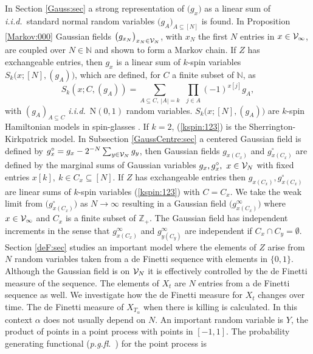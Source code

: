 \documentclass[preprint,11pt]{elsarticle}
\theoremstyle{remark}
\def\pgfl{\emph{p.g.fl.~}}
\def\iid{\emph{i.i.d.}~}
\begin{document}
{In Section \ref{Gauss:sec} a strong representation of $\big (g_x\big )$ 
as a linear sum of \iid  standard normal random variables $\big (g_A\big )_{A\subseteq [N]}$ is found.
In Proposition \ref{Markov:000} Gaussian fields $\big (g_{x_N}\big )_{x_N \in {\cal V}_N}$, 
with $x_N$ the first $N$ entries in $x\in {\cal V}_\infty$, are coupled over $N\in \mathbb{N}$ and shown to form a Markov chain.
If $Z$ has exchangeable entries, then $g_x$ is a linear sum 
 of $k$-spin variables $S_k\big (x;[N],(g_A)\big )$, which  are defined, for $C$ a finite subset of $\mathbb{N}$, as
\begin{equation}
S_k(x;C,(g_A)) =\sum_{A \subseteq C,\ |A|=k}\ \ \prod_{j\in A}(-1)^{{x}[j]}g_A,
 \label{kspin:123}
\end{equation}
with $(g_A)_{A\subseteq C}$ \iid N$(0,1)$ random variables.
$S_k\big (x;[N],(g_A)\big )$ are $k$-spin Hamiltonian models in spin-glasses \citep{T2014}. If $k=2$, (\ref{kspin:123}) is the Sherrington-Kirkpatrick model.
In Subsection \ref{GaussCentre:sec} a centered Gaussian field is defined by
$g^\circ_x = g_x - 2^{-N}\sum_{y\in {\cal V}_N}g_y$,
then Gaussian fields $g_{x(C_x)}$ and  $g^\circ_{x(C_x)}$ are defined by the marginal sums of Gaussian variables $g_x, g^\circ_x,\
 x \in {\cal V}_N$ with fixed entries $x[k],\ k \in C_x \subseteq [N]$.
If
$Z$ has exchangeable entries then $g_{x(C_x)},g^\circ_{x(C_x)}$ are linear sums of $k$-spin variables (\ref{kspin:123}) with $C=C_x$.
% 
We take the weak limit from  $\big (g^{\circ}_{x(C_x)}\big )$
as $N\to \infty$ resulting in a Gaussian field 
%
$\big (g^{\infty}_{x(C_x)}\big )$
 where $x \in {\cal V}_\infty$ and $C_x$ is a finite subset of $\mathbb{Z}_+$.
The Gaussian field has independent increments in the sense that $g^\infty_{x(C_x)}$ and $g^\infty_{y(C_y)}$ are independent if $C_x\cap C_y = \emptyset$.
Section \ref{deF:sec} studies an important model where the elements of $Z$ arise from $N$ random variables taken from a de Finetti sequence with elements in $\{0,1\}$. 
Although the Gaussian field is on ${\cal V}_N$ it is effectively controlled by the de Finetti measure of the sequence. The elements of $X_t$ are $N$ entries from a de Finetti sequence as well. We investigate how the de Finetti measure for $X_t$ changes over time. The de Finetti measure of $X_{T_\alpha}$ when there is killing is calculated. In this context $\alpha$ does not usually depend on $N$. An important random variable is $Y$, the product of points in a point process with points in $[-1,1]$.  The probability generating functional (\pgfl) for the point process is
\begin{equation*}

\end{equation*}}
\end{document}
